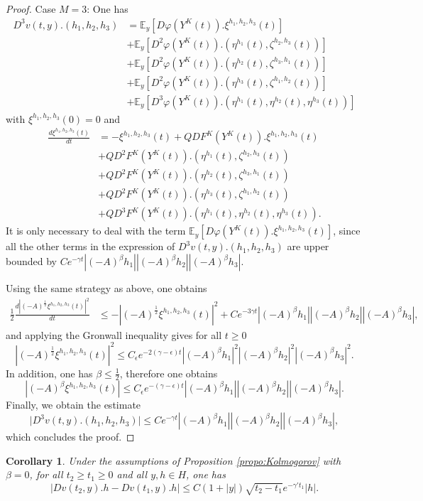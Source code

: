 \documentclass[11pt]{amsart}
\newcommand{\E}{\mathbb{E}}
\newtheorem{cor}[theo]{Corollary}
\begin{document}
\begin{proof}
\noindent
Case $M=3$:
One has
\begin{align*}
D^3v(t,y).(h_1,h_2,h_3)&=\E_y[D\varphi(Y^K(t)).\xi^{h_1,h_2,h_3}(t)]\\
&+\E_y[D^2\varphi(Y^K(t)).(\eta^{h_1}(t),\zeta^{h_2,h_3}(t))]\\
&+\E_y[D^2\varphi(Y^K(t)).(\eta^{h_2}(t),\zeta^{h_3,h_1}(t))]\\
&+\E_y[D^2\varphi(Y^K(t)).(\eta^{h_3}(t),\zeta^{h_1,h_2}(t))]\\
&+\E_y[D^3\varphi(Y^K(t)).(\eta^{h_1}(t),\eta^{h_2}(t),\eta^{h_3}(t))]
\end{align*}
with $\xi^{h_1,h_2,h_3}(0)=0$ and
\begin{align*}
\frac{d\xi^{h_1,h_2,h_3}(t)}{dt}&=-\xi^{h_1,h_2,h_3}(t)+QDF^K(Y^K(t)).\xi^{h_1,h_2,h_3}(t)\\
&+QD^2F^K(Y^K(t)).(\eta^{h_1}(t),\zeta^{h_2,h_3}(t))\\
&+QD^2F^K(Y^K(t)).(\eta^{h_2}(t),\zeta^{h_3,h_1}(t))\\
&+QD^2F^K(Y^K(t)).(\eta^{h_3}(t),\zeta^{h_1,h_2}(t))\\
&+QD^3F^K(Y^K(t)).(\eta^{h_1}(t),\eta^{h_2}(t),\eta^{h_3}(t)).
\end{align*}
It is only necessary to deal with the term $\E_y[D\varphi(Y^K(t)).\xi^{h_1,h_2,h_3}(t)]$, since all the other terms in the expression of $D^3v(t,y).(h_1,h_2,h_3)$ are upper bounded by $Ce^{-\gamma t}|(-A)^{\beta}h_1||(-A)^{\beta}h_2||(-A)^{\beta}h_3|$.

Using the same strategy as above, one obtains
\begin{align*}
\frac12\frac{d|(-A)^{\frac12}\xi^{h_1,h_2,h_3}(t)|^2}{dt}&\le -|(-A)^{\frac12}\xi^{h_1,h_2,h_3}(t)|^2+Ce^{-3\gamma t}|(-A)^{\beta}h_1||(-A)^{\beta}h_2||(-A)^{\beta}h_3|,
\end{align*}
and applying the Gronwall inequality gives for all $t\ge 0$
\[
|(-A)^{\frac12}\xi^{h_1,h_2,h_3}(t)|^2\le C_\epsilon e^{-2(\gamma-\epsilon)t}|(-A)^{\beta}h_1|^2|(-A)^{\beta}h_2|^2|(-A)^{\beta}h_3|^2.
\]
In addition, one has $\beta\le \frac12$, therefore one obtains
\[
|(-A)^{\beta}\xi^{h_1,h_2,h_3}(t)|\le C_\epsilon e^{-(\gamma-\epsilon)t}|(-A)^{\beta}h_1||(-A)^{\beta}h_2||(-A)^{\beta}h_3|.
\]
Finally, we obtain the estimate
\[
\big|D^3v(t,y).(h_1,h_2,h_3)\big|\le Ce^{-\gamma t}|(-A)^{\beta}h_1||(-A)^{\beta}h_2||(-A)^{\beta}h_3|,
\]
which concludes the proof.
\end{proof}


\begin{cor}
Under the assumptions of Proposition \ref{propo:Kolmogorov} with $\beta=0$, for all $t_2\ge t_1\ge 0$ and all $y,h\in H$, one has
\begin{equation}\label{eq:propo-Kolmogorov2}
|Dv(t_2,y).h-Dv(t_1,y).h|\le C (1+|y|)\sqrt{t_2-t_1}e^{-\gamma' t_1}|h|.
\end{equation}
\end{cor}
\end{document}
